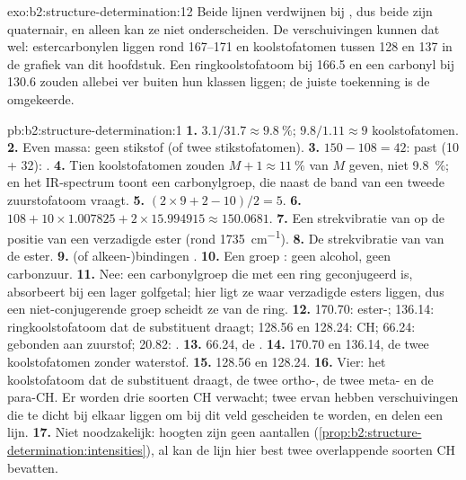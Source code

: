 \begin{solution}{exo:b2:structure-determination:12}
Beide lijnen verdwijnen bij , dus beide zijn quaternair, en  alleen kan ze niet onderscheiden. De verschuivingen
kunnen dat wel: estercarbonylen liggen rond 167--171 en  koolstofatomen tussen 128 en 137 in de grafiek van dit
hoofdstuk. Een ringkoolstofatoom bij 166.5 en een carbonyl bij 130.6 zouden allebei ver buiten hun klassen liggen; de
juiste toekenning is de omgekeerde.
\end{solution}

\begin{solution}{pb:b2:structure-determination:1}
\textbf{1.} $3.1/31.7 \approx 9.8~\%$; $9.8/1.11 \approx 9$ koolstofatomen.
\textbf{2.} Even massa: geen stikstof (of twee stikstofatomen).
\textbf{3.} $150 - 108 = 42$:  past (10 + 32): .
\textbf{4.} Tien koolstofatomen zouden $M+1 \approx 11~\%$ van $M$ geven, niet 9.8~\%; en het IR-spectrum toont een
carbonylgroep, die naast de band van  een tweede zuurstofatoom vraagt.
\textbf{5.} $(2 \times 9 + 2 - 10)/2 = 5$.
\textbf{6.} $108 + 10 \times 1.007825 + 2 \times 15.994915 \approx 150.0681$.
\textbf{7.} Een strekvibratie van  op de positie van een verzadigde ester (rond \qty{1735}{cm^{-1}}).
\textbf{8.} De strekvibratie van  van de ester.
\textbf{9.}  (of alkeen-)bindingen .
\textbf{10.} Een groep : geen alcohol, geen carbonzuur.
\textbf{11.} Nee: een carbonylgroep die met een ring geconjugeerd is, absorbeert bij een lager golfgetal; hier ligt ze waar
verzadigde esters liggen, dus een niet-conjugerende groep scheidt ze van de ring.
\textbf{12.} 170.70: ester-; 136.14: ringkoolstofatoom dat de substituent draagt; 128.56 en 128.24:
 CH; 66.24:  gebonden aan zuurstof; 20.82: .
\textbf{13.} 66.24, de .
\textbf{14.} 170.70 en 136.14, de twee koolstofatomen zonder waterstof.
\textbf{15.} 128.56 en 128.24.
\textbf{16.} Vier: het koolstofatoom dat de substituent draagt, de twee ortho-, de twee meta- en de para-CH. Er worden drie
soorten CH verwacht; twee ervan hebben verschuivingen die te dicht bij elkaar liggen om bij dit veld gescheiden te worden, en delen een lijn.
\textbf{17.} Niet noodzakelijk: hoogten zijn geen aantallen (\cref{prop:b2:structure-determination:intensities}),
al kan de lijn hier best twee overlappende soorten CH bevatten.

\end{solution}
